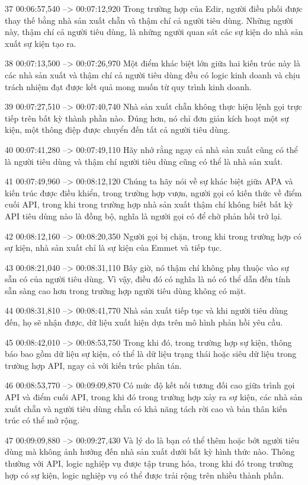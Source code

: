 37
00:06:57,540 --> 00:07:12,920
Trong trường hợp của Edir, người điều phối được thay thế bằng nhà sản xuất chẵn và thậm chí cả người tiêu dùng.  Những người này, thậm chí cả người tiêu dùng, là những người quan sát các sự kiện do nhà sản xuất sự kiện tạo ra.

38
00:07:13,500 --> 00:07:26,970
Một điểm khác biệt lớn giữa hai kiến ​​trúc này là các nhà sản xuất và thậm chí cả người tiêu dùng đều có logic kinh doanh và chịu trách nhiệm đạt được kết quả mong muốn từ quy trình kinh doanh.

39
00:07:27,510 --> 00:07:40,740
Nhà sản xuất chẵn không thực hiện lệnh gọi trực tiếp trên bất kỳ thành phần nào.  Đúng hơn, nó chỉ đơn giản kích hoạt một sự kiện, một thông điệp được chuyển đến tất cả người tiêu dùng.

40
00:07:41,280 --> 00:07:49,110
Hãy nhớ rằng ngay cả nhà sản xuất cũng có thể là người tiêu dùng và thậm chí người tiêu dùng cũng có thể là nhà sản xuất.

41
00:07:49,960 --> 00:08:12,120
Chúng ta hãy nói về sự khác biệt giữa APA và kiến ​​​​trúc được điều khiển, trong trường hợp vượn, người gọi có kiến ​​thức về điểm cuối API, trong khi trong trường hợp nhà sản xuất thậm chí không biết bất kỳ API tiêu dùng nào là đồng bộ, nghĩa là người gọi có  để chờ phản hồi trở lại.

42
00:08:12,160 --> 00:08:20,350
Người gọi bị chặn, trong khi trong trường hợp có sự kiện, nhà sản xuất chỉ là sự kiện của Emmet và tiếp tục.

43
00:08:21,040 --> 00:08:31,110
Bây giờ, nó thậm chí không phụ thuộc vào sự sẵn có của người tiêu dùng.  Vì vậy, điều đó có nghĩa là nó có thể dẫn đến tính sẵn sàng cao hơn trong trường hợp người tiêu dùng không có mặt.

44
00:08:31,810 --> 00:08:41,770
Nhà sản xuất tiếp tục và khi người tiêu dùng đến, họ sẽ nhận được, dữ liệu xuất hiện dựa trên mô hình phản hồi yêu cầu.

45
00:08:42,010 --> 00:08:53,750
Trong khi đó, trong trường hợp sự kiện, thông báo bao gồm dữ liệu sự kiện, có thể là dữ liệu trạng thái hoặc siêu dữ liệu trong trường hợp API, ngay cả với kiến ​​trúc phân tán.

46
00:08:53,770 --> 00:09:09,870
Có mức độ kết nối tương đối cao giữa trình gọi API và điểm cuối API, trong khi đó trong trường hợp xảy ra sự kiện, các nhà sản xuất chẵn và người tiêu dùng chẵn có khả năng tách rời cao và bản thân kiến ​​trúc có thể mở rộng.

47
00:09:09,880 --> 00:09:27,430
Và lý do là bạn có thể thêm hoặc bớt người tiêu dùng mà không ảnh hưởng đến nhà sản xuất dưới bất kỳ hình thức nào.  Thông thường với API, logic nghiệp vụ được tập trung hóa, trong khi đó trong trường hợp có sự kiện, logic nghiệp vụ có thể được trải rộng trên nhiều thành phần.

